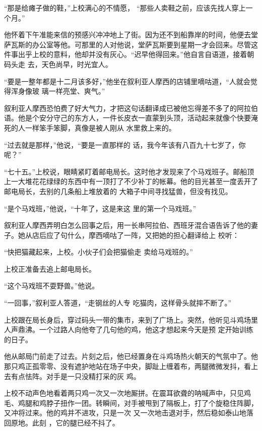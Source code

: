 \documentclass{article}
\begin{document}
“那是给瘫子做的鞋，”上校满心的不情愿，
“那些人卖鞋之前，应该先找人穿上一个月。” 

他怀着下午准能来信的预感兴冲冲地上了街。因为还不到船靠岸的时间，他便去堂萨瓦斯的办公室等他。可那里的人对他说，堂萨瓦斯要到星期一才会回来。尽管这件事出乎上校的意料，他却并没有灰心。“迟早他得回来。”他自言自语道，接着朝码头走
去，天色尚早，时光宜人。 

“要是一整年都是十二月该多好，”他坐在叙利亚人摩西的店铺里嘀咕道，“人就会觉得浑身像玻
璃一样亮堂、爽气。” 

叙利亚人摩西恐怕费了好大气力，才把这句话翻译成已被他忘得差不多了的阿拉伯语。他是个安分守己的东方人，一件长皮衣一直蒙到头顶，活动起来就像个快要淹死的人一样笨手笨脚，真像是被人刚从
水里救上来的。 

\newpage

“过去就是那样，”他说，“要是一直那样的
话，我今年该有八百九十七岁了，你呢？” 

“七十五。”上校说，眼睛紧盯着邮电局长。这时他才发现来了个马戏班子。邮船顶上一大堆花花绿绿的东西中有一顶打了不少补丁的帐幕。他的目光甚至一度丢开了邮电局长，去别的几条船上堆放着的
大箱子中间寻找猛兽，但没有找见。 

“是个马戏班，”他说，“十年了，这是来这
里的第一个马戏班。” 

叙利亚人摩西弄明白怎么回事之后，用一长串阿拉伯、西班牙混合语告诉了他的妻子。她从店后应了句什么，摩西嘀咕了一阵，又把她的担心翻译给上
校听： 

“快把猫藏起来，上校。小伙子们会把猫偷走
卖给马戏班的。” 


\newpage

上校正准备去追上邮电局长。 


“这个马戏班不耍野兽。”他说。 

“一回事，”叙利亚人答道，“走钢丝的人专
吃猫肉，这样骨头就摔不断了。” 

上校跟在局长身后，穿过码头一带的集市，来到了广场上。突然，他听见斗鸡场里人声鼎沸。一个过路人向他夸了几句他的鸡，他这才想起来今天是预
定开始训练的日子。 

他从邮局门前走了过去。片刻之后，他已经置身在斗鸡场热火朝天的气氛中了。他那只鸡正孤零零、没有遮护地站在场子中央，脚趾上缠着布，两腿微微发抖，看上去有点怯阵。对手是一只没精打采的灰
鸡。 

上校不动声色地看着两只鸡一次又一次地厮拼。在震耳欲聋的呐喊声中，只见鸡毛、鸡腿和鸡脖子扭作一团。转瞬间，对手被甩到了隔板上，打了个旋稳住阵脚，又冲将过来。他的鸡并不进攻，只是一次
\newpage
又一次地击退对手，然后稳如泰山地落回原地。此刻
，它的腿已经不抖了。 
\end{document}
